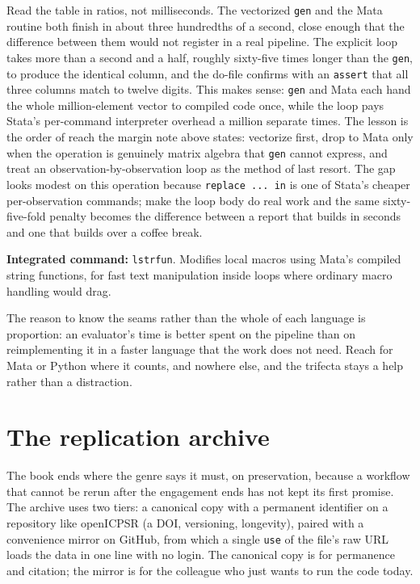 \documentclass[
    a4paper,
    fontsize=10pt,
    twoside=true,
    numbers=noenddot,
]{kaobook}
\begin{document}
Read the table in ratios, not milliseconds. The vectorized \texttt{gen} and the Mata routine both finish in about three hundredths of a second, close enough that the difference between them would not register in a real pipeline. The explicit loop takes more than a second and a half, roughly sixty-five times longer than the \texttt{gen}, to produce the identical column, and the do-file confirms with an \texttt{assert} that all three columns match to twelve digits. This makes sense: \texttt{gen} and Mata each hand the whole million-element vector to compiled code once, while the loop pays Stata's per-command interpreter overhead a million separate times. The lesson is the order of reach the margin note above states: vectorize first, drop to Mata only when the operation is genuinely matrix algebra that \texttt{gen} cannot express, and treat an observation-by-observation loop as the method of last resort. The gap looks modest on this operation because \texttt{replace ... in} is one of Stata's cheaper per-observation commands; make the loop body do real work and the same sixty-five-fold penalty becomes the difference between a report that builds in seconds and one that builds over a coffee break.

\begin{kaobox}[frametitle=Package Integration: \texttt{lstrfun}]
\textbf{Integrated command:} \texttt{lstrfun}. Modifies local macros using Mata's compiled string functions, for fast text manipulation inside loops where ordinary macro handling would drag.
\end{kaobox}

The reason to know the seams rather than the whole of each language is proportion: an evaluator's time is better spent on the pipeline than on reimplementing it in a faster language that the work does not need. Reach for Mata or Python where it counts, and nowhere else, and the trifecta stays a help rather than a distraction.

\section{The replication archive}\label{sec:archive}
The book ends where the genre says it must, on preservation, because a workflow that cannot be rerun after the engagement ends has not kept its first promise. The archive uses two tiers: a canonical copy with a permanent identifier on a repository like openICPSR (a DOI, versioning, longevity), paired with a convenience mirror on GitHub, from which a single \texttt{use} of the file's raw URL loads the data in one line with no login. The canonical copy is for permanence and citation; the mirror is for the colleague who just wants to run the code today.
\end{document}
